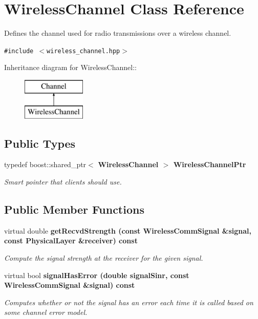 \section{Wireless\-Channel Class Reference}
\label{classWirelessChannel}
Defines the channel used for radio transmissions over a wireless channel.  


{\tt \#include $<$wireless\_\-channel.hpp$>$}

Inheritance diagram for Wireless\-Channel::\begin{figure}[H]
\begin{center}
\leavevmode
\includegraphics[height=2cm]{classWirelessChannel}
\end{center}
\end{figure}
\subsection*{Public Types}
\begin{CompactItemize}
\item 
typedef boost::shared\_\-ptr$<$ \bf{Wireless\-Channel} $>$ \bf{Wireless\-Channel\-Ptr}\label{classWirelessChannel_abd360d48a9d01c3264f4974878d334a}

\begin{CompactList}\small\item\em Smart pointer that clients should use. \item\end{CompactList}\end{CompactItemize}
\subsection*{Public Member Functions}
\begin{CompactItemize}
\item 
virtual double \bf{get\-Recvd\-Strength} (const \bf{Wireless\-Comm\-Signal} \&signal, const \bf{Physical\-Layer} \&receiver) const 
\begin{CompactList}\small\item\em Compute the signal strength at the receiver for the given signal. \item\end{CompactList}\item 
virtual bool \bf{signal\-Has\-Error} (double signal\-Sinr, const \bf{Wireless\-Comm\-Signal} \&signal) const 
\begin{CompactList}\small\item\em Computes whether or not the signal has an error each time it is called based on some channel error model. \item\end{CompactList}\end{CompactItemize}
